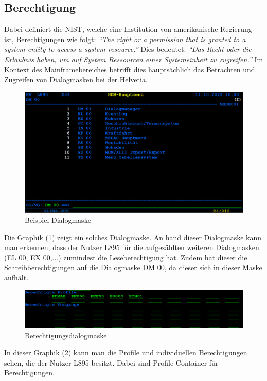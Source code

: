 \subsection{Berechtigung}
\label{sec:Berechtigung}
Dabei definiert die \ac{NIST}, welche eine Institution von amerikanische Regierung ist, Berechtigungen wie folgt:
\newline
\newline
\textit{"`The right or a permission that is granted to a system entity to access a system resource."'} \cite{Auth}
\newline
\newline
Dies bedeutet:
\newline
\newline
\textit{"`Das Recht oder die Erlaubnis haben, um auf System Ressourcen einer Systemeinheit zu zugreifen."'} \cite{Mainframe}
\newline
\newline
Im Kontext des Mainframebereiches betrifft dies hauptsächlich das Betrachten und Zugreifen von Dialogmasken bei der Helvetia.
\begin{figure}[h!]
 \centering
 \includegraphics[width=1\textwidth]{gfx/Picture/Dialog.PNG}
 \caption{Beispiel Dialogmaske}
 \label{fig:Dial}
\end{figure}
Die Graphik (\ref{fig:Dial}) zeigt ein solches Dialogmaske.
An hand dieser Dialogmaske kann man erkennen, dass der Nutzer L895 für die aufgezählten weiteren Dialogmasken (EL 00, EX 00,...) zumindest die Leseberechtigung hat.
Zudem hat dieser die Schreibberechtigungen auf die Dialogmaske DM 00, da dieser sich in dieser Maske aufhält. 
\newline
\newline
\begin{figure}[h!]
 \centering
 \includegraphics[width=1\textwidth]{gfx/Picture/Berechtigung.PNG}
 \caption{Berechtigungsdialogmaske}
 \label{fig:Berch}
\end{figure}
In dieser Graphik (\ref{fig:Berch}) kann man die Profile und individuellen Berechtigungen sehen, die der Nutzer L895 besitzt.
Dabei sind Profile Container für Berechtigungen.

